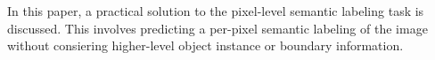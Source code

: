 
\cite{Cordts2016Cityscapes}

In this paper, a practical solution to the pixel-level semantic labeling task is discussed.
This involves predicting a per-pixel semantic labeling of the image without consiering higher-level object instance or boundary information.